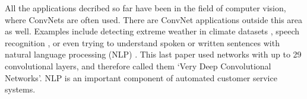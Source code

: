 All the applications decribed so far have been in the field of computer vision, where ConvNets are often used. There are ConvNet applications outside this area as well. Examples include detecting extreme weather in climate datasets \cite{climate},
speech recognition \cite{speech}, 
or even trying to understand spoken or written sentences with natural language processing (NLP) \cite{nlp}. This last paper used networks with up to 29 convolutional layers, and therefore called them `Very Deep Convolutional Networks'. NLP is an important component of automated customer service systems.\\


